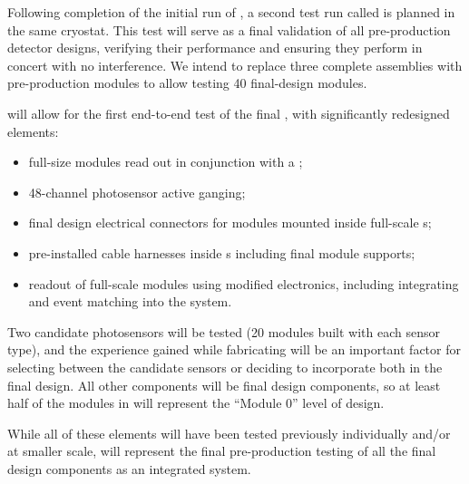 Following completion of the initial run of , a second test run called  is planned in the same cryostat.  This test will serve as a final validation of all pre-production  detector designs, verifying their performance and ensuring they perform in concert with no interference.  We intend to replace three complete  assemblies with pre-production modules to allow testing \num{40} final-design  modules.  

 will allow for the first end-to-end test of the final , with significantly redesigned elements:
\begin{itemize}
    \item full-size  modules read out in conjunction with a ;
    \item \num{48}-channel photosensor active ganging;
    \item final design electrical connectors for  modules mounted inside full-scale s;
    \item pre-installed cable harnesses inside s including final module supports;
    \item readout of full-scale  modules using modified  electronics, including integrating  and  event matching into the  system.
\end{itemize}

Two candidate photosensors will be tested (\num{20} modules built with each sensor type), and the experience gained while fabricating  will be an important factor for selecting 
between the candidate sensors or deciding to incorporate both in the  final design.  All other components will be final design components, so at least half of the  modules in  will represent the ``Module 0'' level of design. 

While all of these elements will have been tested previously individually and/or at smaller scale,  will represent the final pre-production testing of all the final design components as an integrated system.

